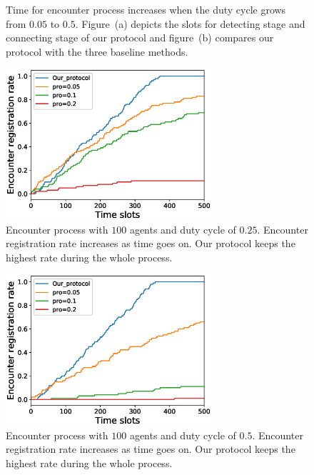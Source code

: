 \begin{figure}[h]
    \centering
    \hspace{0.01in}
    \caption{Time for encounter process increases when the duty cycle grows from $0.05$ to $0.5$.
    Figure~(a) depicts the slots for detecting stage and connecting stage of our protocol and figure~(b)
    compares our protocol with the three baseline methods.}
    \label{fig_DC}
\end{figure}

\begin{figure}[h]
    \centering
    \includegraphics[width=3in]{figures/figure5.eps}
    \caption{Encounter process with $100$ agents and duty cycle of $0.25$. 
    Encounter registration rate increases as time goes on. Our protocol keeps
    the highest rate during the whole process.}
    \label{fig5}
\end{figure}

\begin{figure}[h]
    \centering
    \includegraphics[width=3in]{figures/figure6.eps}
    \caption{Encounter process with $100$ agents and duty cycle of $0.5$. 
    Encounter registration rate increases as time goes on. Our protocol keeps
    the highest rate during the whole process.}
    \label{fig6}
\end{figure}

